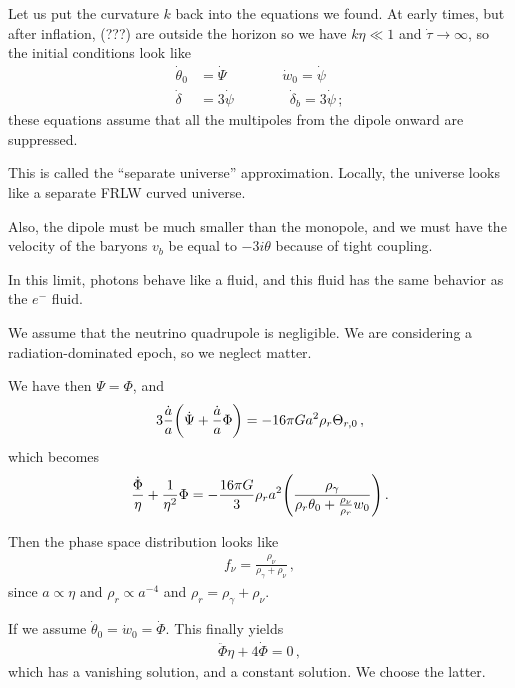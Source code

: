 \documentclass[main.tex]{subfiles}
\begin{document}
Let us put the curvature \(k\) back into the equations we found. 
At early times, but after inflation, (???) are outside the horizon
so we have \(k \eta \ll 1\) and \(\dot{\tau} \rightarrow \infty \), so the initial conditions look like 
%
\begin{align}
\dot{\theta}_{0} &= \dot{\Psi} 
\qquad \qquad
\dot{w}_{0} = \dot{\psi} \\
\dot{\delta} &= 3 \dot{\psi}   
\qquad  \qquad
\dot{\delta}_{b} = 3 \dot{\psi}
\,;
\end{align}
%
these equations assume that all the multipoles from the dipole onward are suppressed. 

This is called the ``separate universe'' approximation. Locally, the universe looks like a separate FRLW curved universe.

Also, the dipole must be much smaller than the monopole, and we must have the velocity of the baryons \(v_b\) be equal to \(-3 i \theta \) because of tight coupling. 

In this limit, photons behave like a fluid, and this fluid has the same behavior as the \(e^{-}\) fluid.

We assume that the neutrino quadrupole is negligible. 
We are considering a radiation-dominated epoch, so we neglect matter. 

We have then \(\Psi = \Phi \), and 
%
\begin{align}
3 \frac{\dot{a}}{a} \qty(\dot{\Psi} + \frac{\dot{a}}{a} \Phi ) = - 16 \pi G a^2 \rho_{r} \Theta_{r, 0}
\,,
\end{align}
%
which becomes 
%
\begin{align}
\frac{\dot{\Phi}}{\eta } + \frac{1}{\eta^2} \Phi 
= - \frac{16 \pi G}{3} \rho_{r} a^2 \qty(\frac{\rho_{\gamma }}{\rho_{r} \theta_{0} + \frac{\rho_{\nu}}{\rho_{r}} w_0 })
\,.
\end{align}

Then the phase space distribution looks like 
%
\begin{align}
f_{\nu } = \frac{\rho_{\nu }}{\rho_{\gamma } + \rho_{\nu }}
\,,
\end{align}
%
since \(a \propto \eta \) and \(\rho_{r} \propto a^{-4} \) and \(\rho_{r} = \rho_{\gamma } + \rho_{\nu }\). 

If we assume \(\dot{\theta}_{0} = \dot{w}_{0} = \dot{\Phi}\). This finally yields 
%
\begin{align}
\ddot{\Phi} \eta + 4 \dot{\Phi} = 0
\,,
\end{align}
%
which has a vanishing solution, and a constant solution. We choose the latter. 
\end{document}
